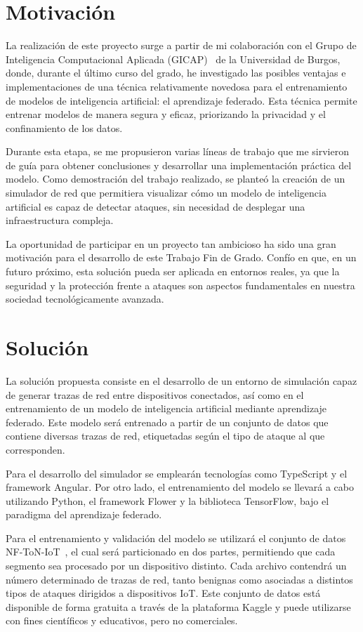 \section{Motivación}
\label{sec:Motivacion}
La realización de este proyecto surge a partir de mi colaboración con el Grupo de Inteligencia Computacional Aplicada (GICAP)~\cite{gicap} de la Universidad de Burgos, donde, durante el último curso del grado, he investigado las posibles ventajas e implementaciones de una técnica relativamente novedosa para el entrenamiento de modelos de inteligencia artificial: el aprendizaje federado. Esta técnica permite entrenar modelos de manera segura y eficaz, priorizando la privacidad y el confinamiento de los datos.

Durante esta etapa, se me propusieron varias líneas de trabajo que me sirvieron de guía para obtener conclusiones y desarrollar una implementación práctica del modelo. Como demostración del trabajo realizado, se planteó la creación de un simulador de red que permitiera visualizar cómo un modelo de inteligencia artificial es capaz de detectar ataques, sin necesidad de desplegar una infraestructura compleja.

La oportunidad de participar en un proyecto tan ambicioso ha sido una gran motivación para el desarrollo de este Trabajo Fin de Grado. Confío en que, en un futuro próximo, esta solución pueda ser aplicada en entornos reales, ya que la seguridad y la protección frente a ataques son aspectos fundamentales en nuestra sociedad tecnológicamente avanzada.

\section{Solución}
\label{sec:Solucion}
La solución propuesta consiste en el desarrollo de un entorno de simulación capaz de generar trazas de red entre dispositivos conectados, así como en el entrenamiento de un modelo de inteligencia artificial mediante aprendizaje federado. Este modelo será entrenado a partir de un conjunto de datos que contiene diversas trazas de red, etiquetadas según el tipo de ataque al que corresponden.

Para el desarrollo del simulador se emplearán tecnologías como TypeScript y el framework Angular. Por otro lado, el entrenamiento del modelo se llevará a cabo utilizando Python, el framework Flower y la biblioteca TensorFlow, bajo el paradigma del aprendizaje federado.

Para el entrenamiento y validación del modelo se utilizará el conjunto de datos NF-ToN-IoT~\cite{dataset}, el cual será particionado en dos partes, permitiendo que cada segmento sea procesado por un dispositivo distinto. Cada archivo contendrá un número determinado de trazas de red, tanto benignas como asociadas a distintos tipos de ataques dirigidos a dispositivos IoT. Este conjunto de datos está disponible de forma gratuita a través de la plataforma Kaggle y puede utilizarse con fines científicos y educativos, pero no comerciales.

